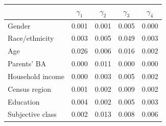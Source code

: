\begin{tabular}{lcccc}
\toprule
 & $\gamma_1$ & $\gamma_2$ & $\gamma_3$ & $\gamma_4$ \\
\midrule
Gender & 0.001 & 0.001 & 0.005 & 0.000 \\
Race/ethnicity & 0.003 & 0.005 & 0.049 & 0.003 \\
Age & 0.026 & 0.006 & 0.016 & 0.002 \\
Parents' BA & 0.000 & 0.011 & 0.000 & 0.000 \\
Household income & 0.000 & 0.003 & 0.005 & 0.002 \\
Census region & 0.001 & 0.002 & 0.009 & 0.002 \\
Education & 0.004 & 0.002 & 0.005 & 0.003 \\
Subjective class & 0.002 & 0.013 & 0.008 & 0.006 \\
\bottomrule
\end{tabular}
